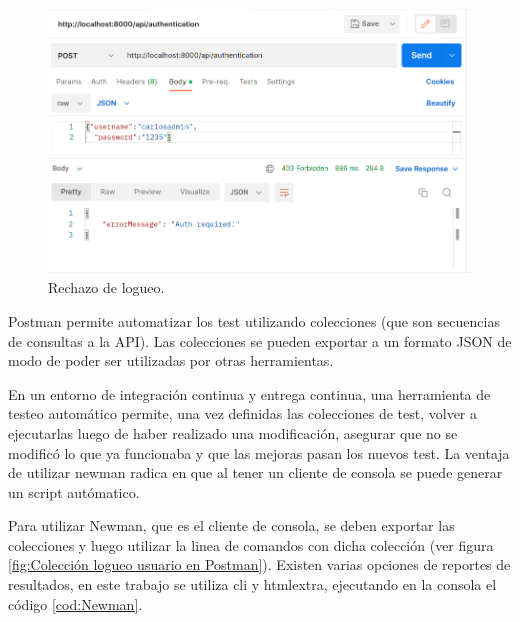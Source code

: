 \begin{figure}[ht]
	\centering
	\includegraphics[scale=.35]{./Figures/no-auth.png}
	\caption{Rechazo de logueo.}
	\label{fig:Rechazo Logueo en el sistema con Postman}
\end{figure}

Postman permite automatizar los test utilizando colecciones (que son secuencias de consultas a la API). Las colecciones se pueden exportar a un formato JSON de modo de poder ser utilizadas por otras herramientas. 

En un entorno de integración continua y entrega continua, una herramienta de testeo automático permite, una vez definidas las colecciones de test, volver a ejecutarlas luego de haber realizado una modificación,  asegurar que no se modificó lo que ya funcionaba y que las mejoras pasan los nuevos test. La ventaja de utilizar newman radica en que al tener un cliente de consola se puede generar un script autómatico.

Para utilizar Newman, que es el cliente de consola, se deben exportar las colecciones y luego utilizar la linea de comandos con dicha colección (ver figura \ref{fig:Colección logueo usuario en Postman}). Existen varias opciones de reportes de resultados, en este trabajo se utiliza cli y htmlextra, ejecutando en la consola el código \ref{cod:Newman}.

